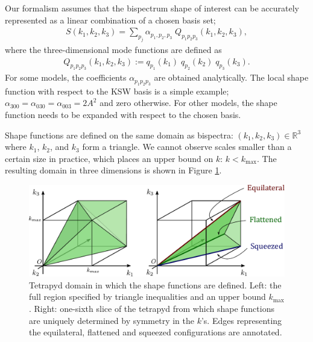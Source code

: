 Our formalism assumes that the bispectrum shape of interest can be accurately represented as a linear combination of a chosen basis set; 
\begin{align}
	S(k_1,k_2,k_3) = \sum_{p_j} \alpha_{p_1,p_2,p_3} \; Q_{p_1 p_2 p_3}(k_1, k_2, k_3),
\end{align}
where the three-dimensional mode functions are defined as
\begin{align}
	Q_{p_1 p_2 p_3} (k_1, k_2, k_3) := q_{p_1}(k_1) \; q_{p_2}(k_2) \; q_{p_3}(k_3).
\end{align}
For some models, the coefficients $\alpha_{p_1 p_2 p_3}$ are obtained analytically. The local shape function with respect to the KSW basis is a simple example; $\alpha_{300}=\alpha_{030}=\alpha_{003}=2A^2$ and zero otherwise. For other models, the shape function needs to be expanded with respect to the chosen basis. 

Shape functions are defined on the same domain as bispectra: $(k_1,k_2,k_3) \in \mathbb{R}^3$ where $k_1$, $k_2$, and $k_3$ form a triangle. We cannot observe scales smaller than a certain size in practice, which places an upper bound on $k$: $k < k_\text{max}$. The resulting domain in three dimensions is shown in Figure \ref{fig:tetrapyd}.

\begin{figure}[htbp!] 
	\centering    
	\hspace{10pt}
	\includegraphics[width=1.0\textwidth]{tetrapyd.pdf}
	\caption{Tetrapyd domain in which the shape functions are defined. Left: the full region specified by triangle inequalities and an upper bound $k_\text{max}$. Right: one-sixth slice of the tetrapyd from which shape functions are uniquely determined by symmetry in the $k$'s. Edges representing the equilateral, flattened and squeezed configurations are annotated.}
	\label{fig:tetrapyd}
\end{figure}

